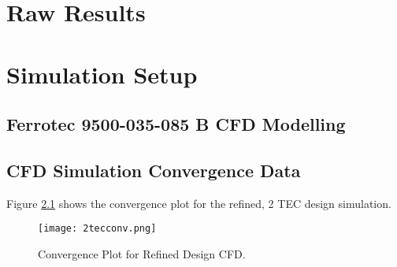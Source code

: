 \appendix
\chapter{Raw Results}
\label{cha:appendix}

\chapter{Simulation Setup}

\section{Ferrotec 9500-035-085 B CFD Modelling}
\label{cha:app_TEC_CFD}

\section{CFD Simulation Convergence Data}
\label{cha:CFDconverg}

Figure \ref{fig:2tecconv} shows the convergence plot for the refined, 2 TEC design simulation.

\begin{figure}[!htb]
	\centering
	\texttt{[image: 2tecconv.png]}
	\caption[Convergence Plot for Refined Design CFD.]{Convergence Plot for Refined Design CFD.}
	\label{fig:2tecconv}
\end{figure} 
\FloatBarrier







%
